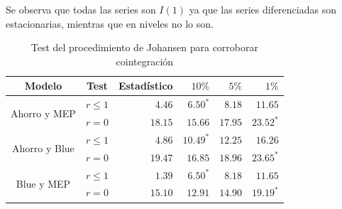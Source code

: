 \documentclass[11pt,a4paper]{article}
\begin{document}
\begin{table}[H]
\centering
{}
\caption{Test de Dickey-Fuller para corroborar la estacionariedad de las series}
\end{table}


Se observa que todas las series son $ I(1) $ ya que las series diferenciadas son estacionarias, mientras que en niveles no lo son.




\begin{table}[H]
\centering
\begin{tabular}{|c|c|r r r r|}
\hline
Modelo & Test & Estadístico & $10 \% $ & $5 \% $ & $1 \% $\\
\hline 
\multirow{2}{2cm}{Ahorro y MEP} & $r \leq 1$  &  $ 4.46 $ & $ 6.50^* $ & $ 8.18 $ & $ 11.65 $ \\ \cline{2-6}
& $r = 0$  & $ 18.15 $ & $ 15.66 $ & $ 17.95 $ & $ 23.52 ^*$\\ \hline
\multirow{2}{2cm}{Ahorro y Blue} & $r \leq 1$ &$ 4.86 $ & $ 10.49^* $ & $ 12.25 $ & $ 16.26 $\\ \cline{2-6}
& $r = 0$  &$ 19.47 $ & $ 16.85 $ & $ 18.96 $ & $ 23.65^* $\\ \hline
\multirow{2}{2cm}{Blue y MEP} & $r \leq 1$  & $ 1.39  $ & $ 6.50^*  $ & $ 8.18 $ & $ 11.65 $\\ \cline{2-6}
& $r = 0$  &$ 15.10 $ & $ 12.91 $ & $ 14.90 $ & $ 19.19^* $\\ \hline
\end{tabular}
\caption{Test del procedimiento de Johansen para corroborar cointegración}
\end{table}
\end{document}
